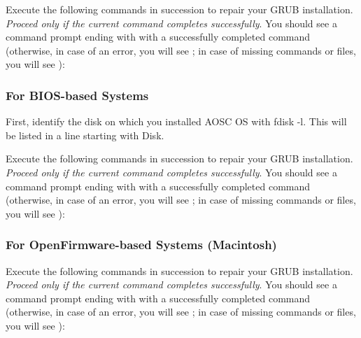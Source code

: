 \documentclass[a5paper,twosided,11pt]{book}
\begin{document}


    Execute the following commands in succession to repair your GRUB installation.
    \textit{Proceed only if the current command completes successfully}.
    You should see a command prompt ending with \icode{\#} with a successfully completed command
    (otherwise, in case of an error, you will see \icode{!}; in case of missing commands or files, you will see ):


    \subsubsection*{For BIOS-based Systems}

    First, identify the disk on which you installed AOSC OS with fdisk -l. This will be listed in a line starting with Disk.

    Execute the following commands in succession to repair your GRUB installation.
    \textit{Proceed only if the current command completes successfully}.
    You should see a command prompt ending with \icode{\#} with a successfully completed command
    (otherwise, in case of an error, you will see \icode{!}; in case of missing commands or files, you will see ):



    \subsubsection*{For OpenFirmware-based Systems (Macintosh)}

    Execute the following commands in succession to repair your GRUB installation.
    \textit{Proceed only if the current command completes successfully}.
    You should see a command prompt ending with \icode{\#} with a successfully completed command
    (otherwise, in case of an error, you will see \icode{!}; in case of missing commands or files, you will see ):
\end{document}
